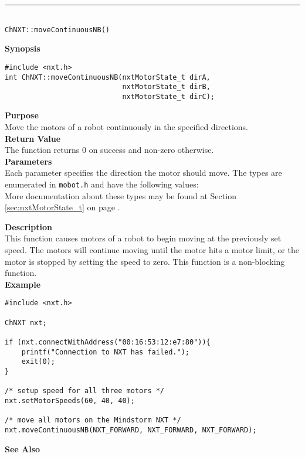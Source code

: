 \noindent
\vspace{5pt}
\rule{4.5in}{0.015in}\\
\noindent
{\LARGE \texttt{ChNXT::moveContinuousNB()} }\\


\noindent
{\bf Synopsis}
\begin{lstlisting}
#include <nxt.h>
int ChNXT::moveContinuousNB(nxtMotorState_t dirA, 
                            nxtMotorState_t dirB, 
                            nxtMotorState_t dirC); 
\end{lstlisting}

\noindent
{\bf Purpose}\\
Move the motors of a robot continuously in the specified directions.\\

\noindent
{\bf Return Value}\\
The function returns 0 on success and non-zero otherwise.\\

\noindent
{\bf Parameters}\\
Each parameter specifies the direction the motor should move. The types
are enumerated in \texttt{mobot.h} and have the following values:\\

\noindent
More documentation about these types may be found at Section
\ref{sec:nxtMotorState_t} on page
\pageref{sec:nxtMotorState_t}.

\noindent
{\bf Description}\\
This function causes motors of a robot to begin moving at the 
previously set speed. The motors will continue moving until the 
motor hits a motor limit, or the motor is stopped by setting the 
speed to zero. This function is a non-blocking function.\\

\noindent
{\bf Example}
\begin{lstlisting}
#include <nxt.h> 

ChNXT nxt;

if (nxt.connectWithAddress("00:16:53:12:e7:80")){
    printf("Connection to NXT has failed.");
    exit(0);
}
 
/* setup speed for all three motors */
nxt.setMotorSpeeds(60, 40, 40);

/* move all motors on the Mindstorm NXT */
nxt.moveContinuousNB(NXT_FORWARD, NXT_FORWARD, NXT_FORWARD);
\end{lstlisting}

\noindent
{\bf See Also}\\
